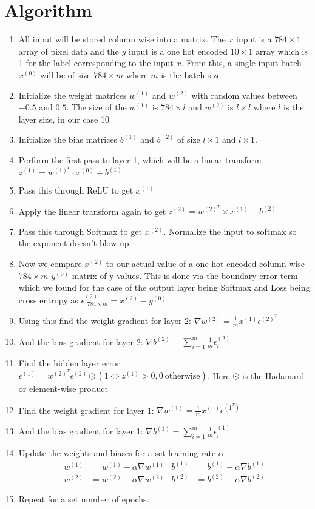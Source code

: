 \documentclass{article}
\begin{document}
\section{Algorithm}

\begin{enumerate}
    \item All input will be stored column wise into a matrix. The $x$ input is a $784\times1$ array of pixel data and the $y$ input is a one hot encoded $10\times 1$ array which is 1 for the label corresponding to the input $x$. From this, a single input batch $x^{(0)}$ will be of size $784\times m $ where $m$ is the batch size
    \item Initialize the weight matrices $w^{(1)}$ and $w^{(2)}$ with random values between $-0.5$ and $0.5$. The size of the $w^{(1)}$ is $784\times l$ and $w^{(2)}$ is $l\times l$ where $l$ is the layer size, in our case 10
    \item Initialize the bias matrices $b^{(1)}$ and $b^{(2)}$ of size $l\times 1$ and $l\times 1$.
    \item Perform the first pass to layer 1, which will be a linear transform $z^{(1)} = w^{(1)^T}\cdot x^{(0)} +b^{(1)}$
    \item Pass this through ReLU to get $x^{(1)}$
    \item Apply the linear transform again to get $z^{(2)} = w^{(2)^T}\times x^{(1)}+b^{(2)}$
    \item Pass this through Softmax to get $x^{(2)}$. Normalize the input to softmax so the exponent doesn't blow up.
    \item Now we compare $x^{(2)}$ to our actual value of a one hot encoded column wise $784 \times m$ $y^{(0)}$ matrix of y values. This is done via the boundary error term which we found for the case of the output layer being Softmax and Loss being cross entropy as $\epsilon^{(2)}_{\ \ 784\times m} = x^{(2)}-y^{(0)}$
    \item Using this find the weight gradient for layer 2: $\nabla w^{(2)} = \frac{1}{m}x^{(1)}\epsilon^{(2)^T}$
    \item And the bias gradient for layer 2: $\nabla b^{(2)} = \sum_{i=1}^m\frac{1}{m}\epsilon^{(2)}_i$ 
    \item Find the hidden layer error $\epsilon^{(1)} = w^{(2)^T}\epsilon^{(2)}\odot (1 \iff{z^{(1)}>0}, 0 \ \text{otherwise})$. Here $\odot$ is the Hadamard or element-wise product
    \item Find the weight gradient for layer 1: $\nabla w^{(1)} = \frac{1}{m}x^{(0)}\epsilon^{(1^T)}$
    \item And the bias gradient for layer 1: $\nabla b^{(1)} = \sum_{i=1}^m\frac{1}{m}\epsilon^{(1)}_i$
    \item Update the weights and biases for a set learning rate $\alpha$
    \begin{align*}
        w^{(1)} &= w^{(1)}-\alpha\nabla w^{(1)} & b^{(1)} &= b^{(1)}-\alpha\nabla b^{(1)}\\
        w^{(2)} &= w^{(2)}-\alpha\nabla w^{(2)} & b^{(2)} &= b^{(2)}-\alpha\nabla b^{(2)}
    \end{align*}
    \item Repeat for a set number of epochs. 
    
\end{enumerate}
\end{document}
